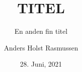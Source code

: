 \documentclass{beamer}
\title{TITEL}
\subtitle{En anden fin titel}
\author{Anders Holst Rasmussen}
\date{28. Juni, 2021}
\begin{document}
\frame\titlepage



\end{document}
